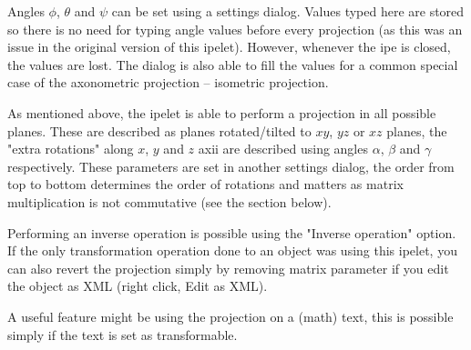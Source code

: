 \documentclass[11pt,a4paper]{article}
\begin{document}
Angles $ \phi $, $ \theta $ and $ \psi $ can be set using a settings dialog. Values typed here are stored so there is no need for typing angle values before every projection (as this was an issue in the original version of this ipelet). However, whenever the ipe is closed, the values are lost. The dialog is also able to fill the values for a common special case of the axonometric projection -- isometric projection.

As mentioned above, the ipelet is able to perform a projection in all possible planes. These are described as planes rotated/tilted to $ xy $, $ yz $ or $ xz $ planes, the "extra rotations" along $ x $, $ y $ and $ z $ axii are described using angles $ \alpha $, $ \beta $ and $ \gamma $ respectively. These parameters are set in another settings dialog, the order from top to bottom determines the order of rotations and matters as matrix multiplication is not commutative (see the section below).

Performing an inverse operation is possible using the "Inverse operation" option. If the only transformation operation done to an object was using this ipelet, you can also revert the projection simply by removing matrix parameter if you edit the object as XML (right click, Edit as XML).

A useful feature might be using the projection on a (math) text, this is possible simply if the text is set as transformable.
\end{document}
